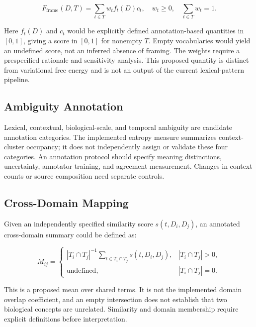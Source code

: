 \documentclass[
]{article}
\newcounter{none} %
\numberwithin{equation}{section}
\begin{document}
\begin{equation}\label{eq:discursive_framing}
F_{\mathrm{frame}}(D,T)=\sum_{t\in T}w_t f_t(D)c_t,
\quad w_t\geq0,\quad\sum_{t\in T}w_t=1.
\end{equation}

Here \(f_t(D)\) and \(c_t\) would be explicitly defined annotation-based
quantities in \([0,1]\), giving a score in \([0,1]\) for nonempty \(T\).
Empty vocabularies would yield an undefined score, not an inferred
absence of framing. The weights require a prespecified rationale and
sensitivity analysis. This proposed quantity is distinct from
variational free energy and is not an output of the current
lexical-pattern pipeline.

\subsection{Ambiguity Annotation}\label{ambiguity-annotation}

Lexical, contextual, biological-scale, and temporal ambiguity are
candidate annotation categories. The implemented entropy measure
summarizes context-cluster occupancy; it does not independently assign
or validate these four categories. An annotation protocol should specify
meaning distinctions, uncertainty, annotator training, and agreement
measurement. Changes in context counts or source composition need
separate controls.

\subsection{Cross-Domain Mapping}\label{cross-domain-mapping}

Given an independently specified similarity score \(s(t,D_i,D_j)\), an
annotated cross-domain summary could be defined as:

\begin{equation}\label{eq:cross_domain_mapping}
M_{ij}=
\begin{cases}
|T_i\cap T_j|^{-1}\displaystyle\sum_{t\in T_i\cap T_j}s(t,D_i,D_j), & |T_i\cap T_j|>0,\\
\mathrm{undefined}, & |T_i\cap T_j|=0.
\end{cases}
\end{equation}

This is a proposed mean over shared terms. It is not the implemented
domain overlap coefficient, and an empty intersection does not establish
that two biological concepts are unrelated. Similarity and domain
membership require explicit definitions before interpretation.
\end{document}
